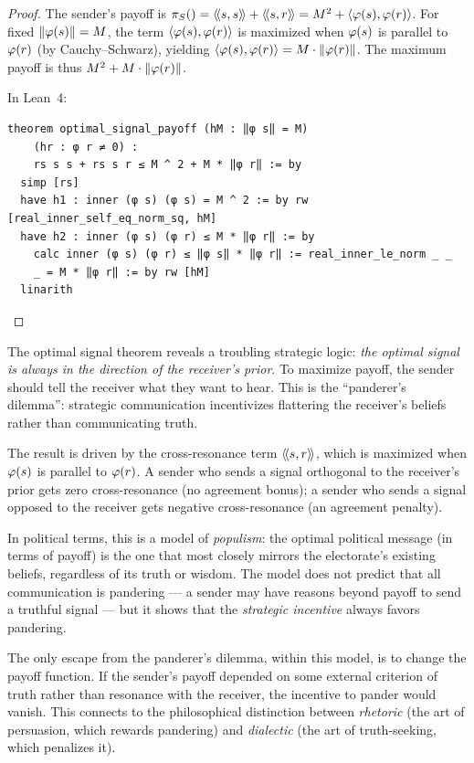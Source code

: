 \begin{proof}
The sender's payoff is $\pi_{S}() = \langle\!\langle s, s \rangle\!\rangle + \langle\!\langle s, r \rangle\!\rangle = M^2 +
\langle \varphi(s), \varphi(r) \rangle$. For fixed $\lVert \varphi(s) \rVert = M$, the term
$\langle \varphi(s), \varphi(r) \rangle$ is maximized when $\varphi(s)$ is parallel to
$\varphi(r)$ (by Cauchy--Schwarz), yielding $\langle \varphi(s), \varphi(r) \rangle = M \cdot
\lVert \varphi(r) \rVert$. The maximum payoff is thus $M^2 + M \cdot \lVert \varphi(r) \rVert$.

In Lean~4:
\begin{lstlisting}
theorem optimal_signal_payoff (hM : ‖φ s‖ = M)
    (hr : φ r ≠ 0) :
    rs s s + rs s r ≤ M ^ 2 + M * ‖φ r‖ := by
  simp [rs]
  have h1 : inner (φ s) (φ s) = M ^ 2 := by rw [real_inner_self_eq_norm_sq, hM]
  have h2 : inner (φ s) (φ r) ≤ M * ‖φ r‖ := by
    calc inner (φ s) (φ r) ≤ ‖φ s‖ * ‖φ r‖ := real_inner_le_norm _ _
    _ = M * ‖φ r‖ := by rw [hM]
  linarith
\end{lstlisting}
\end{proof}

\begin{interpretation}
\label{interp:panderer}
The optimal signal theorem reveals a troubling strategic logic:
\emph{the optimal signal is always in the direction of the receiver's prior}.
To maximize payoff, the sender should tell the receiver what they want to hear.
This is the ``panderer's dilemma'': strategic communication incentivizes
flattering the receiver's beliefs rather than communicating truth.

The result is driven by the cross-resonance term $\langle\!\langle s, r \rangle\!\rangle$, which is maximized
when $\varphi(s)$ is parallel to $\varphi(r)$. A sender who sends a signal
orthogonal to the receiver's prior gets zero cross-resonance (no agreement
bonus); a sender who sends a signal opposed to the receiver gets negative
cross-resonance (an agreement penalty).

In political terms, this is a model of \emph{populism}: the optimal political
message (in terms of payoff) is the one that most closely mirrors the electorate's
existing beliefs, regardless of its truth or wisdom. The model does not predict
that all communication is pandering --- a sender may have reasons beyond payoff
to send a truthful signal --- but it shows that the \emph{strategic incentive}
always favors pandering.

The only escape from the panderer's dilemma, within this model, is to change the
payoff function. If the sender's payoff depended on some external criterion of
truth rather than resonance with the receiver, the incentive to pander would
vanish. This connects to the philosophical distinction between \emph{rhetoric}
(the art of persuasion, which rewards pandering) and \emph{dialectic} (the art
of truth-seeking, which penalizes it).
\end{interpretation}


